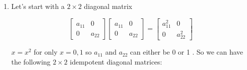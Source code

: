 \begin{enumerate}
\begin{enumerate}
\item $ \begin{aligned} Ix=\left[\begin{array}{ll}1 & 0 \\ 0 & 1\end{array}\right]_{2 \times 2}\left[\begin{array}{l}x_{1} \\ x_{2}\end{array}\right]=\left[\begin{array}{l}x_{1} \\ x_{2}\end{array}\right]\end{aligned}$ \\~\\

\item $ \begin{aligned} x^T I=\left[\begin{array}{ll}x_{1} & x_{2}\end{array}\right]\left[\begin{array}{ll}1 & 0 \\ 0 & 1\end{array}\right]_{2 \times 2}=\left[\begin{array}{ll}x_{1} & x_{2}\end{array}\right]\end{aligned}$ \\~\\
\end{enumerate}

\item[4.] Let's start with a $2 \times 2$ diagonal matrix

\[
\left[\begin{array}{cc}
a_{11} & 0 \\
0 & a_{22}
\end{array}\right]\left[\begin{array}{cc}
a_{11} & 0 \\
0 & a_{22}
\end{array}\right]=\left[\begin{array}{cc}
a_{11}^{2} & 0 \\
0 & a_{22}^{2}
\end{array}\right]
\]

$x=x^{2}$ for only $x=0,1$ so $a_{11}$ and $a_{22}$ can either be 0 or 1 . So we can have the following $2 \times 2$ idempotent diagonal matrices:


\end{enumerate}
